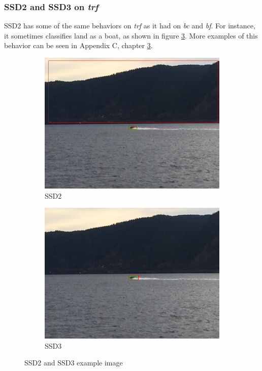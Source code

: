 \subsubsection{SSD2 and SSD3 on \textit{trf}}

SSD2 has some of the same behaviors on \textit{trf} as it had on \textit{bc} and \textit{bf}. For instance, it sometimes classifies land as a boat, as shown in figure \ref{fig:ssd_trf_bigbox}. More examples of this behavior can be seen in Appendix C, chapter \ref{fig:ssd_trf_bigbox}.

\begin{figure}[h!]
\begin{subfigure}{.5\textwidth}
  \centering
  \includegraphics[width=0.8\linewidth]{results/case_buildings/ssdtrf/ssd2/grov2/IMG_2325.jpg}
  \caption{SSD2}
  \label{fig:ex_trf_prec_rec_yolo}
\end{subfigure}%
\begin{subfigure}{.5\textwidth}
  \centering
  \includegraphics[width=.8\linewidth]{results/case_buildings/ssdtrf/ssd3/grov2/IMG_2325.jpg}
  \caption{SSD3}
  \label{fig:ex_trf_prec_rec_ssd}
\end{subfigure}
\caption{SSD2 and SSD3 example image}
\label{fig:ssd_trf_bigbox}
\end{figure}

